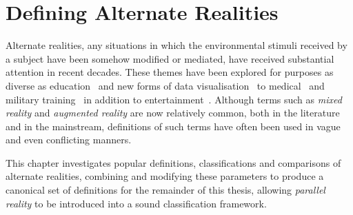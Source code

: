 


\section{Defining Alternate Realities}

Alternate realities, any situations in which the environmental stimuli received by a subject have been somehow modified or mediated, have received substantial attention in recent decades. These themes have been explored for purposes as diverse as education~\cite{Warburton2009} and new forms of data visualisation~\cite{Coleman2009} to medical~\cite{TenEyck2011} and military training~\cite{Qiu2009} in addition to entertainment~\cite{Scherrer2008}. Although terms such as \textit{mixed reality} and \textit{augmented reality} are now relatively common, both in the literature and in the mainstream, definitions of such terms have often been used in vague and even conflicting manners.

This chapter investigates popular definitions, classifications and comparisons of alternate realities, combining and modifying these parameters to produce a canonical set of definitions for the remainder of this thesis, allowing \textit{parallel reality} to be introduced into a sound classification framework.

